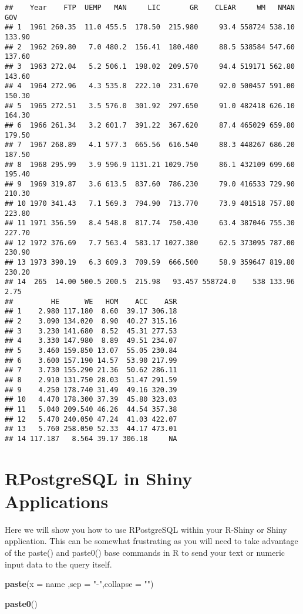 \documentclass[]{book}
\newenvironment{Shaded}{\begin{snugshade}}{\end{snugshade}}
\newcommand{\KeywordTok}[1]{\textcolor[rgb]{0.13,0.29,0.53}{\textbf{#1}}}
\newcommand{\DataTypeTok}[1]{\textcolor[rgb]{0.13,0.29,0.53}{#1}}
\newcommand{\StringTok}[1]{\textcolor[rgb]{0.31,0.60,0.02}{#1}}
\newcommand{\NormalTok}[1]{#1}
\begin{document}
\begin{verbatim}
##    Year    FTP  UEMP   MAN     LIC       GR    CLEAR     WM   NMAN    GOV
## 1  1961 260.35  11.0 455.5  178.50  215.980     93.4 558724 538.10 133.90
## 2  1962 269.80   7.0 480.2  156.41  180.480     88.5 538584 547.60 137.60
## 3  1963 272.04   5.2 506.1  198.02  209.570     94.4 519171 562.80 143.60
## 4  1964 272.96   4.3 535.8  222.10  231.670     92.0 500457 591.00 150.30
## 5  1965 272.51   3.5 576.0  301.92  297.650     91.0 482418 626.10 164.30
## 6  1966 261.34   3.2 601.7  391.22  367.620     87.4 465029 659.80 179.50
## 7  1967 268.89   4.1 577.3  665.56  616.540     88.3 448267 686.20 187.50
## 8  1968 295.99   3.9 596.9 1131.21 1029.750     86.1 432109 699.60 195.40
## 9  1969 319.87   3.6 613.5  837.60  786.230     79.0 416533 729.90 210.30
## 10 1970 341.43   7.1 569.3  794.90  713.770     73.9 401518 757.80 223.80
## 11 1971 356.59   8.4 548.8  817.74  750.430     63.4 387046 755.30 227.70
## 12 1972 376.69   7.7 563.4  583.17 1027.380     62.5 373095 787.00 230.90
## 13 1973 390.19   6.3 609.3  709.59  666.500     58.9 359647 819.80 230.20
## 14  265  14.00 500.5 200.5  215.98   93.457 558724.0    538 133.96   2.75
##         HE      WE   HOM    ACC    ASR
## 1    2.980 117.180  8.60  39.17 306.18
## 2    3.090 134.020  8.90  40.27 315.16
## 3    3.230 141.680  8.52  45.31 277.53
## 4    3.330 147.980  8.89  49.51 234.07
## 5    3.460 159.850 13.07  55.05 230.84
## 6    3.600 157.190 14.57  53.90 217.99
## 7    3.730 155.290 21.36  50.62 286.11
## 8    2.910 131.750 28.03  51.47 291.59
## 9    4.250 178.740 31.49  49.16 320.39
## 10   4.470 178.300 37.39  45.80 323.03
## 11   5.040 209.540 46.26  44.54 357.38
## 12   5.470 240.050 47.24  41.03 422.07
## 13   5.760 258.050 52.33  44.17 473.01
## 14 117.187   8.564 39.17 306.18     NA
\end{verbatim}

\chapter{RPostgreSQL in Shiny
Applications}\label{rpostgresql-in-shiny-applications}

Here we will show you how to use RPostgreSQL within your R-Shiny or
Shiny application. This can be somewhat frustrating as you will need to
take advantage of the paste() and paste0() base commands in R to send
your text or numeric input data to the query itself.

\begin{Shaded}
\begin{Highlighting}[]
\KeywordTok{paste}\NormalTok{(}\DataTypeTok{x =}\NormalTok{ name ,}\DataTypeTok{sep =} \StringTok{"-"}\NormalTok{,}\DataTypeTok{collapse =} \StringTok{""}\NormalTok{)}

\KeywordTok{paste0}\NormalTok{()}
\end{Highlighting}
\end{Shaded}
\end{document}
